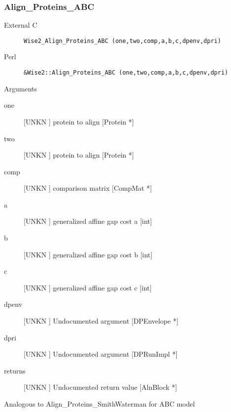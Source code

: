 \subsubsection{Align_Proteins_ABC}
\begin{description}
\item[External C] {\tt Wise2_Align_Proteins_ABC (one,two,comp,a,b,c,dpenv,dpri)}
\item[Perl] {\tt &Wise2::Align_Proteins_ABC (one,two,comp,a,b,c,dpenv,dpri)}

\end{description}
Arguments
\begin{description}
\item[one] [UNKN ] protein to align [Protein *]
\item[two] [UNKN ] protein to align [Protein *]
\item[comp] [UNKN ] comparison matrix [CompMat *]
\item[a] [UNKN ] generalized affine gap cost a [int]
\item[b] [UNKN ] generalized affine gap cost b [int]
\item[c] [UNKN ] generalized affine gap cost c [int]
\item[dpenv] [UNKN ] Undocumented argument [DPEnvelope *]
\item[dpri] [UNKN ] Undocumented argument [DPRunImpl *]
\item[returns] [UNKN ] Undocumented return value [AlnBlock *]
\end{description}
Analogous to Align_Proteins_SmithWaterman for ABC model


